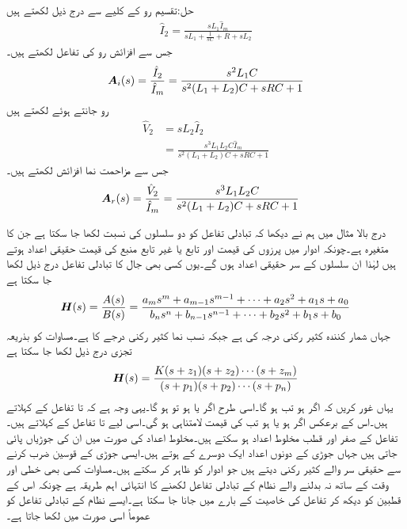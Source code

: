 حل:تقسیم رو کے کلیے سے درج ذیل لکھتے ہیں
\begin{align*}
\hat{I}_2=\frac{ sL_1 \hat{I}_m}{sL_1+\frac{1}{sC}+R+sL_2}
\end{align*}
جس سے افزائش رو کی تفاعل لکھتے ہیں۔
\begin{align*}
{\ensuremath{{\boldsymbol{A}}}}_i(s)=\frac{\hat{I}_2}{\hat{I}_m}=\frac{ s^2 L_1 C}{s^2 (L_1+L_2)C +s RC +1}
\end{align*}
رو  جانتے ہوئے  لکھتے ہیں
\begin{align*}
\hat{V}_2&= sL_2\hat{I}_2\\
&=\frac{ s^3 L_1 L_2 C \hat{I}_m}{s^2 (L_1+L_2)C +s RC +1}
\end{align*}
جس سے مزاحمت نما افزائش لکھتے ہیں۔
\begin{align*}
{\ensuremath{{\boldsymbol{A}}}}_r(s)&=\frac{\hat{V}_2}{\hat{I}_m}=\frac{ s^3 L_1 L_2 C}{s^2 (L_1+L_2)C +s RC +1}
\end{align*}

درج بالا مثال میں ہم نے دیکھا کہ تبادلی تفاعل کو دو سلسلوں کی نسبت   لکھا جا سکتا ہے جن کا متغیرہ  ہے۔چونکہ ادوار میں پرزوں کی قیمت اور تابع یا غیر تابع منبع کی قیمت حقیقی اعداد ہوتے ہیں لہٰذا ان سلسلوں کے سر حقیقی  اعداد ہوں گے۔یوں کسی بھی جال کا تبادلی تفاعل درج ذیل لکھا جا سکتا ہے
\begin{align}\label{مساوات_تعددی_تبادلی_تفاعل_الف}
{\ensuremath{{\boldsymbol{H}}}}(s)=\frac{A(s)}{B(s)}=\frac{a_m s^m+a_{m-1} s^{m-1}+\cdots+a_2 s^2+a_1 s+a_0}{b_n s^n+b_{n-1} s^{n-1}+\cdots+b_2 s^2+b_1 s+b_0}
\end{align}
جہاں شمار کنندہ کثیر رکنی  درجہ کی ہے جبکہ  نسب نما کثیر رکنی  درجے کا ہے۔مساوات  کو بذریعہ تجزی درج ذیل لکھا جا سکتا ہے
\begin{align}\label{مساوات_تعددی_تبادلی_تفاعل_ب}
{\ensuremath{{\boldsymbol{H}}}}(s)=\frac{K (s+z_1)(s+z_2)\cdots (s+z_m)}{(s+p_1)(s+p_2) \cdots (s+p_n)}
\end{align}
یہاں غور کریں کہ اگر  ہو تب  ہو گا۔اسی طرح  اگر  یا  ہو تو   ہو گا۔یہی وجہ ہے کہ  تا  تفاعل کے  کہلاتے ہیں۔اس کے برعکس اگر  ہو یا   ہو تب  کی قیمت لامتناہی ہو گی۔اسی لیے  تا  تفاعل کے  کہلاتے ہیں۔تفاعل کے صفر اور قطب مخلوط اعداد ہو سکتے ہیں۔مخلوط اعداد کی صورت میں ان کی جوڑیاں پائی جاتی ہیں جہاں جوڑی کے دونوں اعداد ایک دوسرے کے  ہوتے ہیں۔ایسی جوڑی کے قوسین ضرب کرنے سے حقیقی سر والے کثیر رکنی دیتے ہیں جو ادوار کو ظاہر کر سکتے ہیں۔مساوات  کسی بھی خطی اور وقت کے ساتھ نہ بدلنے والے نظام کے تبادلی تفاعل لکھنے کا انتہائی اہم طریقہ ہے چونکہ اس کے قطبین کو دیکھ کر تفاعل کی خاصیت کے بارے میں جانا جا سکتا ہے۔ایسے نظام کے تبادلی تفاعل کو عموماً اسی صورت میں لکھا جاتا ہے۔

